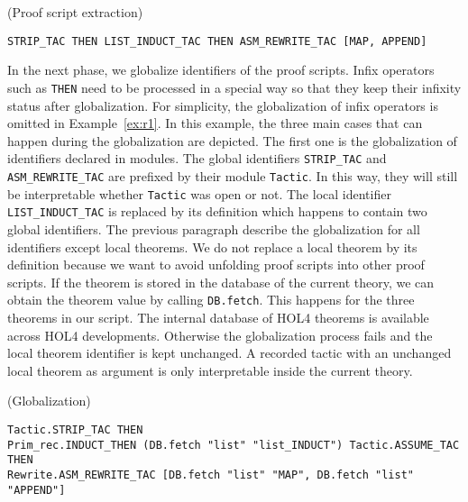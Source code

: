 \documentclass[runningheads,a4paper,draft]{svjour3}
\def\holfour{\textsf{HOL4}\xspace}
\begin{document}
\begin{example}\label{ex:r0}(Proof script extraction)
\small
\begin{lstlisting}[language=SMLSmall]
STRIP_TAC THEN LIST_INDUCT_TAC THEN ASM_REWRITE_TAC [MAP, APPEND]
\end{lstlisting}
\end{example} 

In the next phase, we globalize identifiers of the proof scripts. 
Infix operators such as \texttt{THEN} need to be processed in a special way so 
that they keep their infixity status after globalization. For simplicity, 
the 
globalization of infix operators is omitted in Example~\ref{ex:r1}.
In this example, the three main cases that can happen during the globalization
are depicted. The first one is the globalization of identifiers declared in 
modules. The global identifiers \texttt{STRIP\_TAC} and 
\texttt{ASM\_REWRITE\_TAC} are prefixed by their module \texttt{Tactic}. In 
this way, they will still be interpretable whether \texttt{Tactic} was open or 
not. The local identifier \texttt{LIST\_INDUCT\_TAC} is replaced by its 
definition which happens to contain two global identifiers.
The previous paragraph describe the globalization for all identifiers except 
local theorems.  We do not replace a local
theorem by its definition because we want to avoid unfolding proof scripts into 
other proof scripts.
If the theorem is stored in the database of the current theory, we 
can obtain the theorem value by calling \texttt{DB.fetch}. This happens for the 
three theorems in our script. The internal database of \holfour theorems is 
available across \holfour developments. 
Otherwise the globalization process fails and the local theorem identifier is 
kept unchanged. A recorded tactic with an unchanged local theorem as argument 
is only interpretable inside the current theory.

\begin{example}\label{ex:r1} (Globalization)
\begin{lstlisting}[language=SMLSmall]
Tactic.STRIP_TAC THEN
Prim_rec.INDUCT_THEN (DB.fetch "list" "list_INDUCT") Tactic.ASSUME_TAC THEN
Rewrite.ASM_REWRITE_TAC [DB.fetch "list" "MAP", DB.fetch "list" "APPEND"]
\end{lstlisting}
\end{example} 
\end{document}
